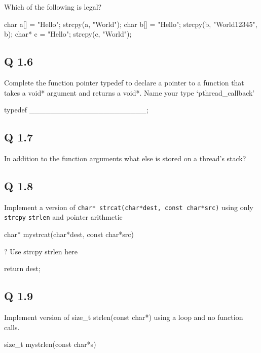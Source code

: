 Which of the following is legal?

\begin{code}[language=C]
char a[] = "Hello"; strcpy(a, "World");
char b[] = "Hello"; strcpy(b, "World12345", b);
char* c = "Hello"; strcpy(c, "World");
\end{code}

\subsection{Q 1.6}\label{q-1.6}

Complete the function pointer typedef to declare a pointer to a function that takes a void* argument and returns a void*. Name your type `pthread\_callback'

\begin{code}[language=C]
typedef ______________________;
\end{code}

\subsection{Q 1.7}\label{q-1.7}

In addition to the function arguments what else is stored on a thread's stack?

\subsection{Q 1.8}\label{q-1.8}

Implement a version of \texttt{char*\ strcat(char*dest,\ const\ char*src)} using only \texttt{strcpy} \texttt{strlen} and pointer arithmetic

\begin{code}[language=C]
char* mystrcat(char*dest, const char*src) {

  ? Use strcpy strlen here

  return dest;
}
\end{code}

\subsection{Q 1.9}\label{q-1.9}

Implement version of size\_t strlen(const char*) using a loop and no function calls.

\begin{code}[language=C]
size_t mystrlen(const char*s) {

}
\end{code}


